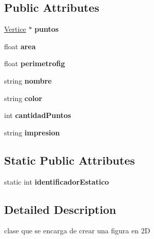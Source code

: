 \subsection*{Public Attributes}
\begin{DoxyCompactItemize}
\item 
\mbox{\label{class_figura_ae0b5056c74aade600709487640d5f679}} 
\hyperlink{class_vertice}{Vertice} $\ast$ {\bfseries puntos}
\item 
\mbox{\label{class_figura_ae3d1ec3d0d1e9786bb200112a018bc87}} 
float {\bfseries area}
\item 
\mbox{\label{class_figura_a261190a959c238f674083daaadb6bd79}} 
float {\bfseries perimetrofig}
\item 
\mbox{\label{class_figura_a5be336617ed8a4d4f28115297b38da02}} 
string {\bfseries nombre}
\item 
\mbox{\label{class_figura_a9f519b9504b95440f124a3099070e952}} 
string {\bfseries color}
\item 
\mbox{\label{class_figura_ad45f3e1033b11ecd2205154a7dff6a36}} 
int {\bfseries cantidad\+Puntos}
\item 
\mbox{\label{class_figura_a29836f970de23e98d29116a0179f8618}} 
string {\bfseries impresion}
\end{DoxyCompactItemize}
\subsection*{Static Public Attributes}
\begin{DoxyCompactItemize}
\item 
\mbox{\label{class_figura_a06e9faa5dd891e95a5d4f041e63266b7}} 
static int {\bfseries identificador\+Estatico}
\end{DoxyCompactItemize}


\subsection{Detailed Description}
clase que se encarga de crear una figura en 2D 

